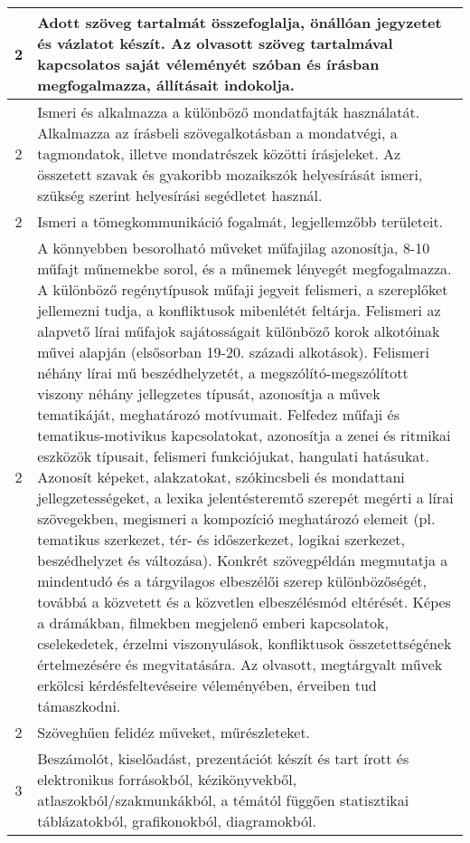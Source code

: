 \begin{longtable}{c | p{12cm} }
                                
                                          2 &  Adott szöveg tartalmát összefoglalja, önállóan jegyzetet és vázlatot készít. Az olvasott szöveg tartalmával kapcsolatos saját véleményét szóban és írásban megfogalmazza, állításait indokolja. \\ \hline
                                          2 &  Ismeri és alkalmazza a különböző mondatfajták használatát. Alkalmazza az írásbeli szövegalkotásban a mondatvégi, a tagmondatok, illetve mondatrészek közötti írásjeleket. Az összetett szavak és gyakoribb mozaikszók helyesírását ismeri, szükség szerint helyesírási segédletet használ. \\ \hline
                                          2 &  Ismeri a tömegkommunikáció fogalmát, legjellemzőbb területeit. \\ \hline
                                          2 &  A könnyebben besorolható műveket műfajilag azonosítja, 8-10 műfajt műnemekbe sorol, és a műnemek lényegét megfogalmazza. A különböző regénytípusok műfaji jegyeit felismeri, a szereplőket jellemezni tudja, a konfliktusok mibenlétét feltárja. Felismeri az alapvető lírai műfajok sajátosságait különböző korok alkotóinak művei alapján (elsősorban 19-20. századi alkotások). Felismeri néhány lírai mű beszédhelyzetét, a megszólító-megszólított viszony néhány jellegzetes típusát, azonosítja a művek tematikáját, meghatározó motívumait. Felfedez műfaji és tematikus-motivikus kapcsolatokat, azonosítja a zenei és ritmikai eszközök típusait, felismeri funkciójukat, hangulati hatásukat. Azonosít képeket, alakzatokat, szókincsbeli és mondattani jellegzetességeket, a lexika jelentésteremtő szerepét megérti a lírai szövegekben, megismeri a kompozíció meghatározó elemeit (pl. tematikus szerkezet, tér- és időszerkezet, logikai szerkezet, beszédhelyzet és változása). Konkrét szövegpéldán megmutatja a mindentudó és a tárgyilagos elbeszélői szerep különbözőségét, továbbá a közvetett és a közvetlen elbeszélésmód eltérését. Képes a drámákban, filmekben megjelenő emberi kapcsolatok, cselekedetek, érzelmi viszonyulások, konfliktusok összetettségének értelmezésére és megvitatására. Az olvasott, megtárgyalt művek erkölcsi kérdésfeltevéseire véleményében, érveiben tud támaszkodni. \\ \hline
                                          2 &  Szöveghűen felidéz műveket, műrészleteket. \\ \hline
                                      
                                
                                          3 &  Beszámolót, kiselőadást, prezentációt készít és tart írott és elektronikus forrásokból, kézikönyvekből, atlaszokból/szakmunkákból, a témától függően statisztikai táblázatokból, grafikonokból, diagramokból. \\ \hline
                                      

\end{longtable}
